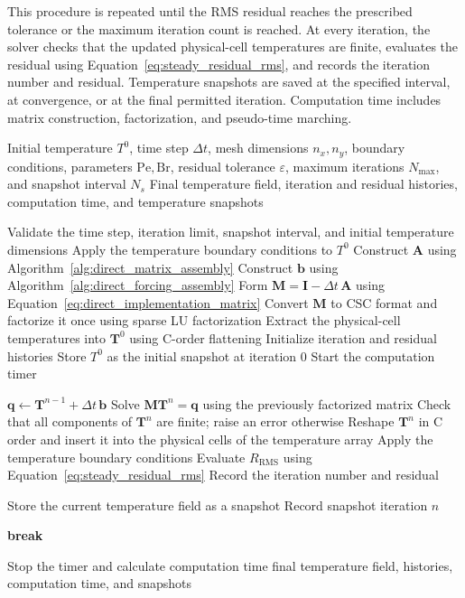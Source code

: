 This procedure is repeated until the RMS residual reaches
the prescribed tolerance or the maximum iteration count is
reached. At every iteration, the solver checks that the
updated physical-cell temperatures are finite, evaluates
the residual using Equation~\eqref{eq:steady_residual_rms},
and records the iteration number and residual. Temperature
snapshots are saved at the specified interval, at convergence,
or at the final permitted iteration. Computation time includes
matrix construction, factorization, and pseudo-time marching.

\begin{algorithm}[H]
\caption{Direct Sparse Solver with Reusable LU Factorization}
\label{alg:direct_complete_solver}
\begin{algorithmic}[1]
\Require Initial temperature $T^0$, time step $\Delta t$,
mesh dimensions $n_x,n_y$, boundary conditions, parameters
$\mathrm{Pe},\mathrm{Br}$, residual tolerance $\varepsilon$,
maximum iterations $N_{\max}$, and snapshot interval $N_s$
\Ensure Final temperature field, iteration and residual histories,
computation time, and temperature snapshots

\State Validate the time step, iteration limit, snapshot interval,
and initial temperature dimensions
\State Apply the temperature boundary conditions to $T^0$
\State Construct $\mathbf{A}$ using
Algorithm~\ref{alg:direct_matrix_assembly}
\State Construct $\mathbf{b}$ using
Algorithm~\ref{alg:direct_forcing_assembly}
\State Form $\mathbf{M}=\mathbf{I}-\Delta t\,\mathbf{A}$
using Equation~\eqref{eq:direct_implementation_matrix}
\State Convert $\mathbf{M}$ to CSC format and factorize it once
using sparse LU factorization
\State Extract the physical-cell temperatures into
$\mathbf{T}^0$ using C-order flattening
\State Initialize iteration and residual histories
\State Store $T^0$ as the initial snapshot at iteration $0$
\State Start the computation timer

    \State $\mathbf{q}\gets
    \mathbf{T}^{n-1}+\Delta t\,\mathbf{b}$
    \State Solve $\mathbf{M}\mathbf{T}^{n}=\mathbf{q}$
    using the previously factorized matrix
    \State Check that all components of $\mathbf{T}^{n}$
    are finite; raise an error otherwise
    \State Reshape $\mathbf{T}^{n}$ in C order and insert it
    into the physical cells of the temperature array
    \State Apply the temperature boundary conditions
    \State Evaluate $R_{\mathrm{RMS}}$ using
    Equation~\eqref{eq:steady_residual_rms}
    \State Record the iteration number and residual

        \State Store the current temperature field as a snapshot
        \State Record snapshot iteration $n$
    \EndIf

        \State \textbf{break}
    \EndIf
\EndFor

\State Stop the timer and calculate computation time
\State \Return final temperature field, histories,
computation time, and snapshots
\end{algorithmic}
\end{algorithm}

